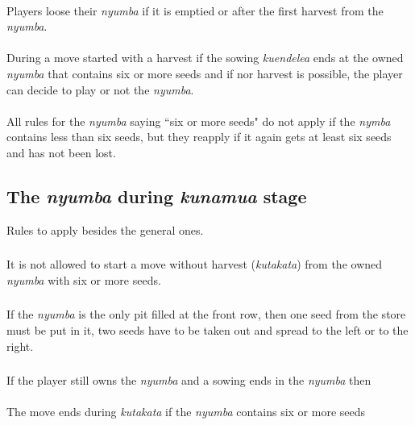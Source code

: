 \documentclass[12pt,a4paper]{article}
\begin{document}
\paragraph{}\label{NyuGR1}
 Players loose their {\it nyumba} if it is emptied or after the first harvest from the {\it nyumba}.
\paragraph{}\label{NyuGR2}
 During a move started with a harvest if the sowing {\it kuendelea} ends at the owned {\it nyumba} that contains six or more seeds and if nor harvest is possible, the player can decide to play or not the {\it nyumba}.
\paragraph{}\label{NyuGR3}
 All rules for the {\it nyumba} saying ``six or more seeds" do not apply if the {\it nymba} contains less than six seeds, but they reapply if it again gets at least six seeds and has not been lost.

\subsection{\bf The {\it nyumba} during {\it kunamua} stage}\label{NyuTndks} 
Rules to apply besides the general ones.

\subsubsection{}\label{NyuTndks1} 
It is not allowed to start a move without harvest ({\it kutakata}) from the owned {\it nyumba} with six or more seeds.
\subsubsection{}\label{NyuTndks2}
If the {\it nyumba} is the only pit filled at the front row, then one seed from the store must be put in it, two seeds have to be taken out and spread to the left or to the right.
\subsubsection{}\label{NyuTndks3}
If the player still owns the {\it nyumba} and a sowing ends in the {\it nyumba} then
\paragraph{}\label{NyuTndks3.1}
The move ends during {\it kutakata} if the {\it nyumba} contains six or more seeds
\end{document}
